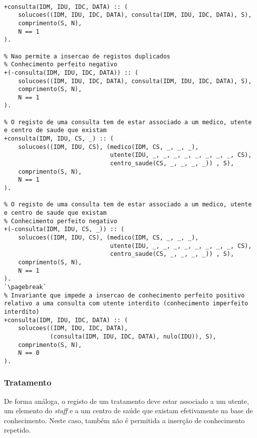 \

\begin{lstlisting}[caption={Invariantes de inserção relativos ao predicado \texttt{consulta}}]
% Nao permite a insercao de registos duplicados
+consulta(IDM, IDU, IDC, DATA) :: (
    solucoes((IDM, IDU, IDC, DATA), consulta(IDM, IDU, IDC, DATA), S),
    comprimento(S, N),
    N == 1
).

% Nao permite a insercao de registos duplicados
% Conhecimento perfeito negativo
+(-consulta(IDM, IDU, IDC, DATA)) :: (
    solucoes((IDM, IDU, IDC, DATA), consulta(IDM, IDU, IDC, DATA), S),
    comprimento(S, N),
    N == 1
).

% O registo de uma consulta tem de estar associado a um medico, utente e centro de saude que existam
+consulta(IDM, IDU, CS, _) :: (
    solucoes((IDM, IDU, CS), (medico(IDM, CS, _, _, _),
                              utente(IDU, _, _, _, _, _, _, _, _, CS),
                              centro_saude(CS, _, _, _, _)) , S),
    comprimento(S, N),
    N == 1
).

% O registo de uma consulta tem de estar associado a um medico, utente e centro de saude que existam
% Conhecimento perfeito negativo
+(-consulta(IDM, IDU, CS, _)) :: (
    solucoes((IDM, IDU, CS), (medico(IDM, CS, _, _, _),
                              utente(IDU, _, _, _, _, _, _, _, _, CS),
                              centro_saude(CS, _, _, _, _)) , S),
    comprimento(S, N),
    N == 1
).
`\pagebreak`
% Invariante que impede a insercao de conhecimento perfeito positivo relativo a uma consulta com utente interdito (conhecimento imperfeito interdito)
+consulta(IDM, IDU, IDC, DATA) :: (
    solucoes((IDM, IDU, IDC, DATA),
             (consulta(IDM, IDU, IDC, DATA), nulo(IDU)), S),
    comprimento(S, N),
    N == 0
).
\end{lstlisting}

\subsubsection*{Tratamento}
De forma análoga, o registo de um tratamento deve estar associado a um utente, um elemento do \textit{staff} e a um centro
de saúde que existam efetivamente na base de conhecimento. Neste caso, também não é permitida a inserção de
conhecimento repetido.

\

